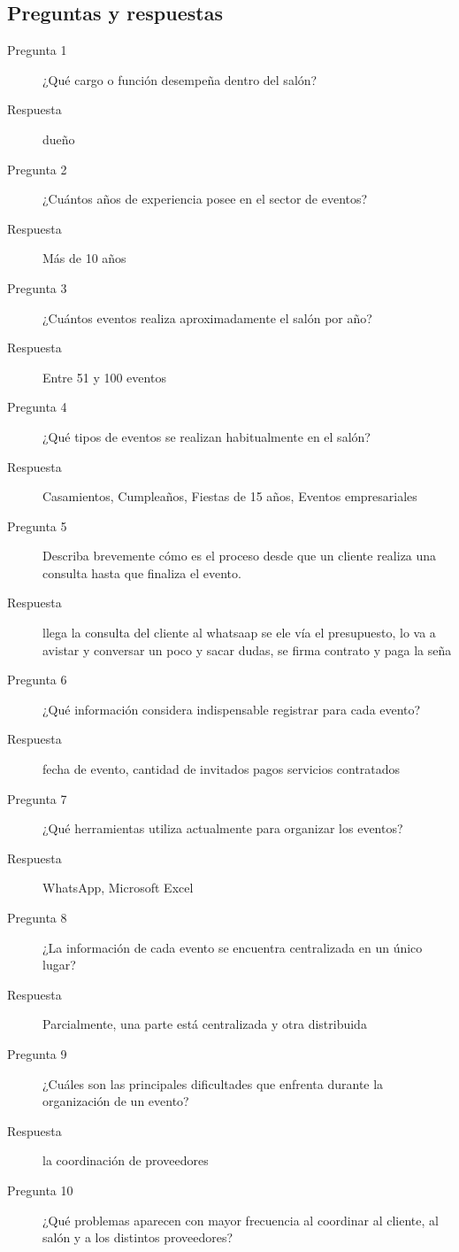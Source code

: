 \subsection{Preguntas y respuestas}

\begin{description}
    \item[Pregunta 1] ¿Qué cargo o función desempeña dentro del salón?
    \item[Respuesta] dueño
    \item[Pregunta 2] ¿Cuántos años de experiencia posee en el sector de eventos?
    \item[Respuesta] Más de 10 años
    \item[Pregunta 3] ¿Cuántos eventos realiza aproximadamente el salón por año?
    \item[Respuesta] Entre 51 y 100 eventos
    \item[Pregunta 4] ¿Qué tipos de eventos se realizan habitualmente en el salón?
    \item[Respuesta] Casamientos, Cumpleaños, Fiestas de 15 años, Eventos empresariales
    \item[Pregunta 5] Describa brevemente cómo es el proceso desde que un cliente realiza una consulta hasta que finaliza el evento.
    \item[Respuesta] llega la consulta del cliente al whatsaap se ele vía el presupuesto, lo va a avistar y conversar un poco y sacar dudas, se firma contrato y paga la seña
    \item[Pregunta 6] ¿Qué información considera indispensable registrar para cada evento?
    \item[Respuesta] fecha de evento, cantidad de invitados pagos servicios contratados
    \item[Pregunta 7] ¿Qué herramientas utiliza actualmente para organizar los eventos?
    \item[Respuesta] WhatsApp, Microsoft Excel
    \item[Pregunta 8] ¿La información de cada evento se encuentra centralizada en un único lugar?
    \item[Respuesta] Parcialmente, una parte está centralizada y otra distribuida
    \item[Pregunta 9] ¿Cuáles son las principales dificultades que enfrenta durante la organización de un evento?
    \item[Respuesta] la coordinación de proveedores
    \item[Pregunta 10] ¿Qué problemas aparecen con mayor frecuencia al coordinar al cliente, al salón y a los distintos proveedores?

\end{description}
